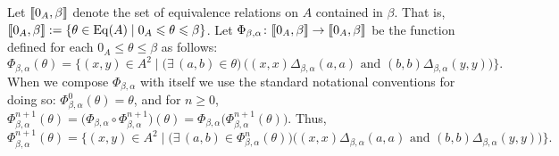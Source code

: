 Let $\llbracket 0_A, \beta\rrbracket$ denote the set of equivalence relations on $A$ contained in $\beta$.  That is, 
 $\llbracket 0_A, \beta\rrbracket:= \{\theta \in \operatorname{Eq}(A) \mid 0_A \leqslant \theta \leqslant \beta\}$. 
Let $\Phi_{\beta, \alpha} \colon \llbracket 0_A, \beta\rrbracket\to \llbracket 0_A, \beta\rrbracket$ be the function defined
for each $0_A \leq \theta \leq \beta$ as follows:
\begin{equation}
  \label{eq:6}
  \Phi_{\beta, \alpha}(\theta)
  = \{ (x,y) \in A^2 \mid
  \bigl(\exists\, (a,b) \in \theta\big)\,
\bigl(  (x,x) \mathrel{\Delta_{\beta, \alpha}} (a,a) \text{ and }
  (b,b) \mathrel{\Delta_{\beta, \alpha}} (y,y)\bigr)\}.
\end{equation}
When we compose $\Phi_{\beta, \alpha}$ with itself we use
the standard notational conventions for doing so:
$\Phi_{\beta, \alpha}^0(\theta) = \theta$, and for $n\geq 0$, 
$\Phi_{\beta, \alpha}^{n+1}(\theta) = \bigl(\Phi_{\beta, \alpha} \circ \Phi_{\beta, \alpha}^{n+1}\bigr)(\theta)
 = \Phi_{\beta, \alpha} \bigl(\Phi_{\beta, \alpha}^{n+1}(\theta)\bigr)$.
Thus,
\[
\Phi_{\beta, \alpha}^{n+1}(\theta) =
\{ (x,y) \in A^2 \mid   \bigl(\exists\, (a,b) \in \Phi_{\beta, \alpha}^{n}(\theta)\bigr)
  \bigl((x,x) \mathrel{\Delta_{\beta, \alpha}} (a,a) \text{ and }
  (b,b) \mathrel{\Delta_{\beta, \alpha}} (y,y)\bigr)\}.
\]


\newcommand{\Phiba}{\ensuremath{\Phi_{\beta, \alpha}}}
\newcommand{\Psiba}{\ensuremath{\Psi}}
\newcommand{\thetaba}{\ensuremath{\theta_{\beta, \alpha}}}



